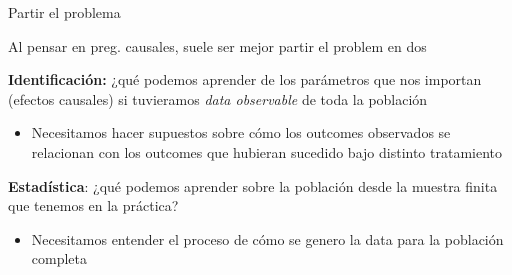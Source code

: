 \documentclass[11pt,handout,aspectratio=169]{beamer}
\newenvironment{wideitemize}{\itemize\addtolength{\itemsep}{10pt}}{\enditemize}
\begin{document}
\begin{frame}{Partir el problema}
	\begin{wideitemize}
		
		\item
		Al pensar en preg. causales, suele ser mejor partir el problem en dos
		
		\item
		\textbf{Identificación:} ¿qué podemos aprender de los parámetros que nos importan (efectos causales) si tuvieramos \textit{data observable} de toda la población

		\begin{itemize}
			\item 
			Necesitamos hacer supuestos sobre cómo los outcomes observados se relacionan con los outcomes que hubieran sucedido bajo distinto tratamiento
			
		\end{itemize}
		
		\item
		\textbf{Estadística}: ¿qué podemos aprender sobre la población desde la muestra finita que tenemos en la práctica?
			\begin{itemize}
				\item 
				Necesitamos entender el proceso de cómo se genero la data para la población completa
			\end{itemize} 	
		
	\end{wideitemize}	
	
\end{frame}
\end{document}
